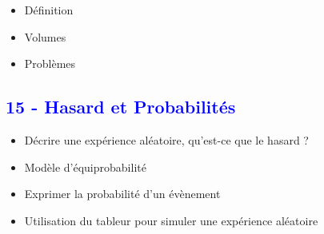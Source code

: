\documentclass[12pt]{article}
\begin{document}
\begin{multicols}{2}
\begin{itemize}
\item Définition
\item Volumes
\item Problèmes
\end{itemize}

\subsection*{\textcolor{blue}{15 - Hasard et Probabilités}}

\begin{itemize}
\item Décrire une expérience aléatoire, qu’est-ce que le hasard ?
\item Modèle d’équiprobabilité
\item Exprimer la probabilité d’un évènement
\item Utilisation du tableur pour simuler une expérience aléatoire
\end{itemize}

\end{multicols}
\end{document}
